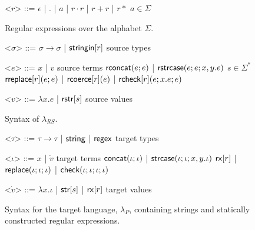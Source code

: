 \documentclass[11pt,leqno]{article}
\theoremstyle{definition}
\newcommand{\lambdap}{\lambda_P}
\newcommand{\sisubst}[3]{{\sf rreplace}[#1](#2;#3)} \newcommand{\rreplace}[3]{{\sf rreplace}[#1](#2;#3)} %
\newcommand{\rcoerce}[2]{{\sf rcoerce}[#1](#2)}
\newcommand{\sistr}[1]{{\sf rstr}[#1]}   \newcommand{\rstr}[1]{{\sf rstr}[#1]} %
\newcommand{\rcheck}[4]{ {\sf rcheck}[#1](#2;#3;#4) }
\newcommand{\strin}[1]{\sistr{#1}}
\newcommand{\rsconcat}[2]{{\sf rconcat}(#1;#2)} \newcommand{\rconcat}[2]{{\sf rconcat}(#1;#2)} %
\newcommand{\stringin}[1]{{\sf stringin}[#1]}
\newcommand{\tcheck}[4]{{\sf check}(#1; #2; #3; #4)}
\renewcommand{\tstr}[1]{{{\sf str}[#1]}}
\newcommand{\preplace}[3]{{\sf replace}(#1;#2;#3)}
\newcommand{\tconcat}[2]{{\sf concat}(#1;#2)} \newcommand{\concat}[2]{{\sf concat}(#1;#2)} %
\newcommand{\rx}[1]{ {\sf rx}[#1] }
\newcommand{\str}{{\sf string}}
\newcommand{\regex}{{\sf regex}}
\newcommand{\strcase}[3]{ {\sf rstrcase}(#1; #2; #3)}
\newcommand{\pstrcase}[3]{ {\sf strcase}(#1; #2; #3)}
\begin{document}





\clearpage
\renewcommand{\grammarlabel}[2]{#1\hfill#2}
\begin{figure}[b]
\small
  \begin{grammar}
<$r$> ::= $\epsilon$ | $.$ | $a$ | $r \cdot r$ | $r + r$ | $r*$ \hfill $a \in \Sigma$

\caption{Regular expressions over the alphabet $\Sigma$.}
\label{fig:regex}
\end{grammar}
\end{figure}
\begin{figure}[t]
\small
  \begin{grammar}
<$\sigma$> ::=  $\sigma \rightarrow \sigma$ | $\stringin{r}$    \hfill  source types

<$e$> ::= 
      $x$ | $v$ \hfill source terms \alt 
      $\rsconcat{e}{e}$ | $\strcase{e}{e}{x,y.e}$ \hfill $s \in \Sigma^{*}$ \alt
      $\sisubst{r}{e}{e}$ | $\rcoerce{r}{e}$ | $\rcheck{r}{e}{x.e}{e}$

<$v$> ::= $\lambda x . e$ | $\strin{s}$ \hfill source values 
\caption{Syntax of $\lambda_{RS}$.}
\label{fig:glambdas}
\end{grammar}
\end{figure}


\renewcommand{\grammarlabel}[2]{#1\hfill#2}

\begin{figure}[t]
\small
  \begin{grammar}

<$\tau$> ::= $\tau \rightarrow \tau$ | $\str$ | $\regex$ \hfill target types

<$\iota$> ::= $x$ | $\dot{v}$ \hfill target terms \alt
$\tconcat{\iota}{\iota}$ | $\pstrcase{\iota}{\iota}{x,y.\iota}$ \alt
  $\rx{r}$ | $\preplace{\iota}{\iota}{\iota}$ | $\tcheck{\iota}{\iota}{\iota}{\iota}$ 

  <$\dot{v}$> ::= $\lambda x . \iota$ | $\tstr{s}$ | $\rx{r}$ \hfill target values

\end{grammar}
\caption{Syntax for the target language, $\lambdap$, containing strings and statically constructed regular expressions.}
\label{fig:lcsSyntax}
\end{figure}
\end{document}
